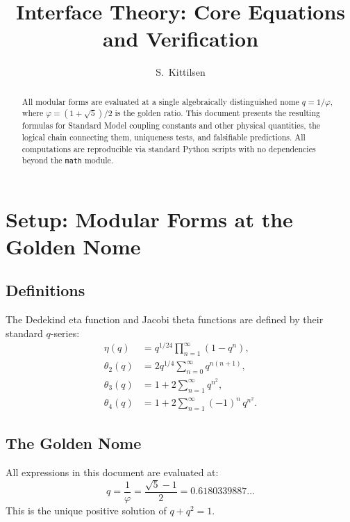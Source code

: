 \documentclass[11pt,a4paper]{article}
\title{Interface Theory: Core Equations and Verification}
\author{S.\ Kittilsen}
\date{}
\newcommand{\vp}{\varphi}
\begin{document}
\maketitle

\begin{abstract}
All modular forms are evaluated at a single algebraically distinguished nome
$q = 1/\vp$, where $\vp = (1+\sqrt{5})/2$ is the golden ratio.
This document presents the resulting formulas for Standard Model coupling constants
and other physical quantities, the logical chain connecting them, uniqueness tests,
and falsifiable predictions. All computations are reproducible via standard Python
scripts with no dependencies beyond the \texttt{math} module.
\end{abstract}

\tableofcontents

\section{Setup: Modular Forms at the Golden Nome}
\label{sec:setup}

\subsection{Definitions}

The Dedekind eta function and Jacobi theta functions are defined by their standard
$q$-series:
\begin{align}
  \eta(q) &= q^{1/24} \prod_{n=1}^{\infty} (1 - q^n), \\[6pt]
  \theta_2(q) &= 2 q^{1/4} \sum_{n=0}^{\infty} q^{n(n+1)}, \\[6pt]
  \theta_3(q) &= 1 + 2\sum_{n=1}^{\infty} q^{n^2}, \\[6pt]
  \theta_4(q) &= 1 + 2\sum_{n=1}^{\infty} (-1)^n\, q^{n^2}.
\end{align}

\subsection{The Golden Nome}

All expressions in this document are evaluated at:
\begin{equation}
  \boxed{q = \frac{1}{\vp} = \frac{\sqrt{5}-1}{2} = 0.6180339887\ldots}
\end{equation}
This is the unique positive solution of $q + q^2 = 1$.
\end{document}
